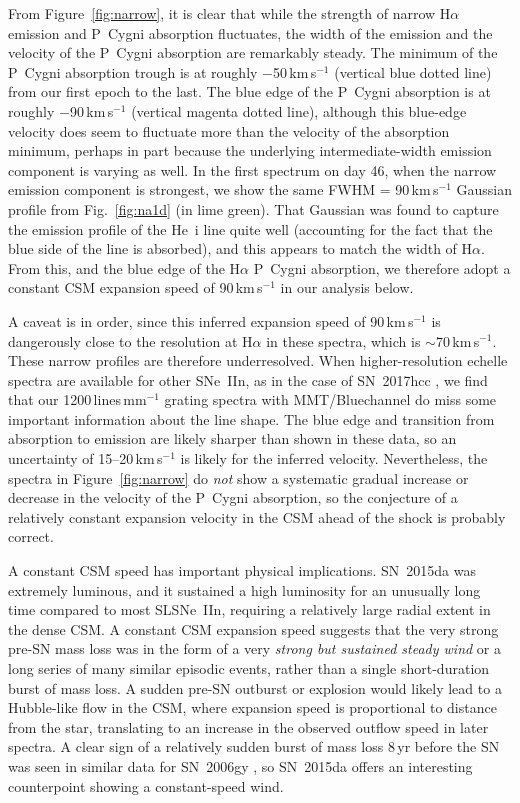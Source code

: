 \documentclass[fleqn,usenatbib,useAMS]{mnras}
\begin{document}
From Figure~\ref{fig:narrow}, it is clear that while the strength of
narrow H$\alpha$ emission and P~Cygni absorption fluctuates, the width
of the emission and the velocity of the P~Cygni absorption are
remarkably steady.  The minimum of the P~Cygni absorption trough is at
roughly $-$50\,km\,s$^{-1}$ (vertical blue dotted line) from our first
epoch to the last.  The blue edge of the P~Cygni absorption is at
roughly $-$90\,km\,s$^{-1}$ (vertical magenta dotted line), although
this blue-edge velocity does seem to fluctuate more than the velocity
of the absorption minimum, perhaps in part because the underlying
intermediate-width emission component is varying as well.  In the
first spectrum on day 46, when the narrow emission component is
strongest, we show the same FWHM = 90\,km\,s$^{-1}$ Gaussian profile
from Fig.~\ref{fig:na1d} (in lime green).  That Gaussian was found to
capture the emission profile of the He~{\sc i} line quite well
(accounting for the fact that the blue side of the line is absorbed),
and this appears to match the width of H$\alpha$.  From
this, and the blue edge of the H$\alpha$ P~Cygni absorption, we
therefore adopt a constant CSM expansion speed of 90\,km\,s$^{-1}$ in
our analysis below.

A caveat is in order, since this inferred expansion speed of 90\,km\,s$^{-1}$ is dangerously close to the resolution at H$\alpha$ in these
spectra, which is $\sim$70\,km\,s$^{-1}$.  These narrow profiles are
therefore underresolved.  When higher-resolution echelle spectra are
available for other SNe~IIn, as in the case of SN~2017hcc
\citep{smith20}, we find that our 1200\,lines\,mm$^{-1}$ grating spectra with
MMT/Bluechannel do miss some important information about the line
shape.  The blue edge and transition from absorption to emission are
likely sharper than shown in these data, so an uncertainty of 15--20\,km\,s$^{-1}$ is likely for the inferred velocity.
Nevertheless, the spectra in Figure~\ref{fig:narrow} do {\it not} show a
systematic gradual increase or decrease in the velocity of the P~Cygni
absorption, so the conjecture of a relatively constant expansion
velocity in the CSM ahead of the shock is probably correct.

A constant CSM speed has important physical implications.  SN~2015da was
extremely luminous, and it sustained a high luminosity for an unusually
long time compared to most SLSNe~IIn, requiring a relatively large
radial extent in the dense CSM.  A constant CSM expansion speed
suggests that the very strong pre-SN mass loss was in the form of a
very {\it strong but sustained steady wind} or a long series of many similar episodic events, rather than a single
short-duration burst of mass loss.  A sudden pre-SN outburst or
explosion would likely lead to a Hubble-like flow in the CSM, where
expansion speed is proportional to distance from the star, translating
to an increase in the observed outflow speed in later spectra. A clear sign of a
relatively sudden burst of mass loss 8\,yr before the SN was seen in
similar data for SN~2006gy \citep{smith10}, so SN~2015da offers an
interesting counterpoint showing a constant-speed wind.
\end{document}
